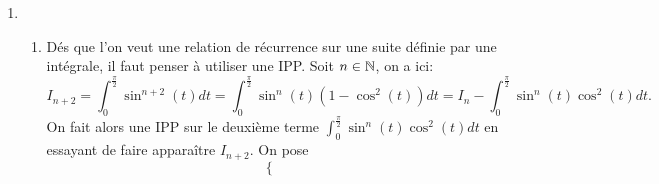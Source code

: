 \documentclass[a4paper, 11pt,reqno]{article}
\begin{document}
\begin{correction}
\begin{enumerate}
\begin{enumerate}
\begin{itemize}
\begin{itemize}
					                  \item[$\star$] $0 \leq \ddp\frac{\pi}{2}$
					                  \item[$\star$]  Pour tout $t\in \lbrack 0,\ddp\frac{\pi}{2}\rbrack$, on a: $\sin^n{(t)}\geq 0$.
				                  \end{itemize}
				                  Ainsi, d'apr\`es le th\'eor\`eme de positivit\'e de l'int\'egrale, on obtient: $I_n\geq 0$. Ainsi, on vient bien de montrer que la suite $(I_n)_{n\in\N}$ est minor\'ee par 0.
				            \item[$\bullet$] La suite $(I_n)_{n\in\N}$ est ainsi d\'ecroissante et minor\'ee par 0, d'apr\`es le th\'eor\`eme sur les suites monotones, elle est donc convergente.
				            \item[$\bullet$] On peut aussi remarquer que le th\'eor\`eme de s\'eparation permet aussi de montrer que: pour tout $n\in\N$, on a m\^eme: $I_n>0$. V\'erifions cela:
				                  \begin{itemize}
					                  \item[$\star$] $f_n:\ t\mapsto \sin^n{(t)}$ continue sur $\lbrack 0,\ddp\frac{\pi}{2}\rbrack$
					                  \item[$\star$] $0 \leq \ddp\frac{\pi}{2}$
					                  \item[$\star$]  Pour tout $t\in \lbrack 0,\ddp\frac{\pi}{2}\rbrack$, on a: $\sin^n{(t)}\geq 0$.
					                  \item[$\star$] $f_n\not\equiv 0$
				                  \end{itemize}
				                  Ainsi, d'apr\`es le th\'eor\`eme de s\'eparation de l'int\'egrale, on obtient: $I_n> 0$.
			            \end{itemize}
		      \end{enumerate}
		\item
		      \begin{enumerate}
			      \item D\'es que l'on veut une relation de r\'ecurrence sur une suite d\'efinie par une int\'egrale, il faut penser \`a utiliser une IPP. Soit $n\in\N$, on a ici:
			            $$I_{n+2}=\int_0^{\frac{\pi}{2}} \sin^{n+2}{(t)}dt=\int_0^{\frac{\pi}{2}} \sin^n{(t)}(1-\cos^2{(t)})dt=I_n-\int_0^{\frac{\pi}{2}} \sin^n{(t)}\cos^2{(t)}dt.$$
			            On fait alors une IPP sur le deuxi\`eme terme $\int_0^{\frac{\pi}{2}} \sin^n{(t)}\cos^2{(t)}dt$ en essayant de faire appara\^itre $I_{n+2}$. On pose
			            $$\left\lbrace\begin{array}{lll}

\end{array}$$
\end{enumerate}
\end{enumerate}
\end{correction}
\end{document}
